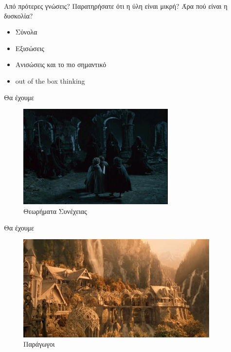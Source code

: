 \documentclass{presentation}
\begin{document}
\begin{frame}{Από πρότερες γνώσεις?}
  Παρατηρήσατε ότι η ύλη είναι μικρή? Άρα πού είναι η δυσκολία?
  \begin{itemize}
    \item Σύνολα
    \item Εξισώσεις
    \item Ανισώσεις \pause και το πιο σημαντικό \pause
    \item out of the box thinking
  \end{itemize}
\end{frame}

\begin{frame}{Θα έχουμε}
  \begin{figure}
    \centering
    \includegraphics[width=0.7\textwidth]{"images/weathertop"}
    \caption{Θεωρήματα Συνέχειας}
  \end{figure}
\end{frame}

\begin{frame}{Θα έχουμε}
  \begin{figure}
    \centering
    \includegraphics[width=0.9\textwidth]{"images/riverdale"}
    \caption{Παράγωγοι}
  \end{figure}
\end{frame}
\end{document}
